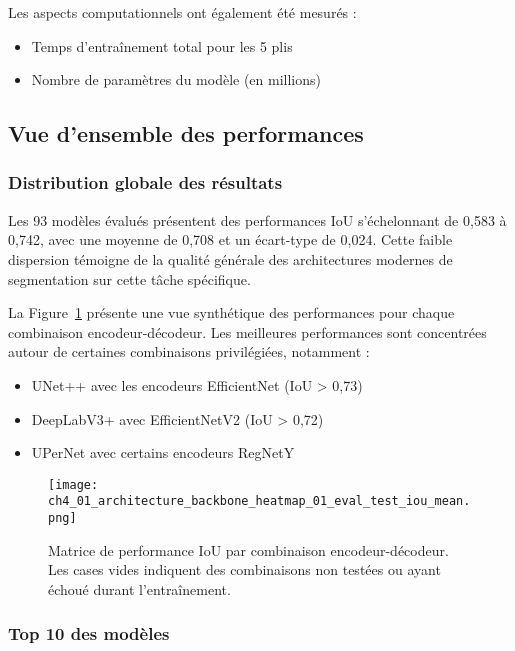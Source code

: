 Les aspects computationnels ont également été mesurés :
\begin{itemize}
    \item Temps d'entraînement total pour les 5 plis
    \item Nombre de paramètres du modèle (en millions)
\end{itemize}

\subsection{Vue d'ensemble des performances}

\subsubsection{Distribution globale des résultats}

Les 93 modèles évalués présentent des performances IoU s'échelonnant de 0,583 à 0,742, avec une moyenne de 0,708 et un écart-type de 0,024. Cette faible dispersion témoigne de la qualité générale des architectures modernes de segmentation sur cette tâche spécifique.

La Figure~\ref{fig:heatmap_iou} présente une vue synthétique des performances pour chaque combinaison encodeur-décodeur. Les meilleures performances sont concentrées autour de certaines combinaisons privilégiées, notamment :

\begin{itemize}
    \item UNet++ avec les encodeurs EfficientNet (IoU > 0,73)
    \item DeepLabV3+ avec EfficientNetV2 (IoU > 0,72)
    \item UPerNet avec certains encodeurs RegNetY
\end{itemize}

\begin{figure}[htbp]
    \centering
    \texttt{[image: ch4\_01\_architecture\_backbone\_heatmap\_01\_eval\_test\_iou\_mean.png]}
    \caption{Matrice de performance IoU par combinaison encodeur-décodeur. Les cases vides indiquent des combinaisons non testées ou ayant échoué durant l'entraînement.}
    \label{fig:heatmap_iou}
\end{figure}

\subsubsection{Top 10 des modèles}

